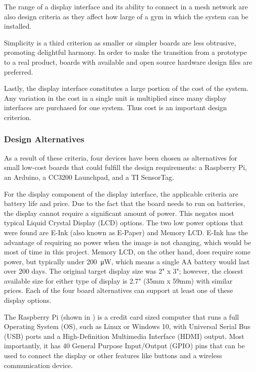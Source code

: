 \documentclass[PPFS.tex]{template/subfiles}
\begin{document}
The range of a display interface and its ability to connect in a mesh network are also design criteria as they affect how large of a gym in which the system can be installed.

Simplicity is a third criterion as smaller or simpler boards are less obtrusive, promoting delightful harmony. In order to make the transition from a prototype to a real product, boards with available and open source hardware design files are preferred.

Lastly, the display interface constitutes a large portion of the cost of the system. Any variation in the cost in a single unit is multiplied since many display interfaces are purchased for one system. Thus cost is an important design criterion.

\subsubsection{Design Alternatives}

As a result of these criteria, four devices have been chosen as alternatives for small low-cost boards that could fulfill the design requirements: a Raspberry Pi, an Arduino, a CC3200 Launchpad, and a TI SensorTag. 

For the display component of the display interface, the applicable criteria are battery life and price. Due to the fact that the board needs to run on batteries, the display cannot require a significant amount of power. This negates most typical Liquid Crystal Display (LCD) options. The two low power options that were found are E-Ink (also known as E-Paper) and Memory LCD. E-Ink has the advantage of requiring no power when the image is not changing, which would be most of time in this project. Memory LCD, on the other hand, does require some power, but typically under \SI{200}{\micro\watt}, which means a single AA battery would last over 200 days. The original target display size was 2" x 3"; however, the closest available size for either type of display is 2.7" (35mm x 59mm) with similar prices. Each of the four board alternatives can support at least one of these display options.

The Raspberry Pi (shown in ) is a credit card sized computer that runs a full Operating System (OS), such as Linux or Windows 10, with Universal Serial Bus (USB) ports and a High-Definition Multimedia Interface (HDMI) output. Most importantly, it has 40 General Purpose Input/Output (GPIO) pins that can be used to connect the display or other features like buttons and a wireless communication device.
\end{document}
